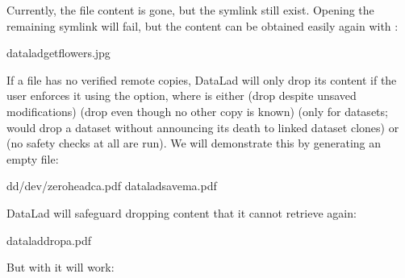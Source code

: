 \sphinxAtStartPar
Currently, the file content is gone, but the symlink still exist. Opening the
remaining symlink will fail, but the content can be obtained easily again with
:

\begin{sphinxVerbatim}[commandchars=\\\{\}]
dataladgetflowers.jpg
\end{sphinxVerbatim}

\sphinxAtStartPar
If a file has no verified remote copies, DataLad will only drop its
content if the user enforces it using the  option, where \sphinxcode{\sphinxupquote{{[}MODE{]}}} is either  (drop despite unsaved modifications)  (drop even though no other copy is known)  (only for datasets; would drop a dataset without announcing its death to linked dataset clones) or  (no safety checks at all are run).
We will demonstrate this by generating an empty file:

\begin{sphinxVerbatim}[commandchars=\\\{\}]
dd/dev/zerohead\PYGZhy{}c\PYGZgt{}a.pdf
dataladsave\PYGZhy{}ma.pdf
\end{sphinxVerbatim}

\sphinxAtStartPar
DataLad will safeguard dropping content that it cannot retrieve again:

\begin{sphinxVerbatim}[commandchars=\\\{\}]
dataladdropa.pdf
\end{sphinxVerbatim}

\sphinxAtStartPar
But with  it will work:


